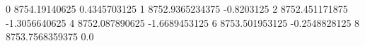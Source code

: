 0 8754.19140625 0.4345703125
1 8752.9365234375 -0.8203125
2 8752.451171875 -1.3056640625
4 8752.087890625 -1.6689453125
6 8753.501953125 -0.2548828125
8 8753.7568359375 0.0
